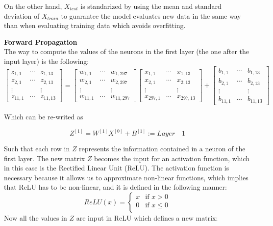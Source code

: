 \documentclass[12pt]{article}
\begin{document}
On the other hand, $X_{test}$ is standarized by using the mean and standard deviation of $X_{train}$ to guarantee the model evaluates new data in the same way than when evaluating training data which avoids overfitting.



\textbf{Forward Propagation}\\
The way to compute the values of the neurons in the first layer (the one after the input layer) is the following:
\[
\begin{bmatrix}
   z_{1,1} & \cdots & z_{1,13} \\
   z_{2,1} & \cdots & z_{2,13} \\
   \vdots &   & \vdots \\
   z_{11,1} & \cdots & z_{11,13}
\end{bmatrix}
=
\begin{bmatrix}
    w_{1,1} & \cdots & w_{1,297} \\
    w_{2,1} & \cdots & w_{2,297} \\
    \vdots &   & \vdots \\
    w_{11,1} & \cdots & w_{11,297}
\end{bmatrix}
\begin{bmatrix}
    x_{1,1} & \cdots & x_{1,13} \\
    x_{2,1} & \cdots & x_{2,13} \\
    \vdots &   & \vdots \\
    x_{297,1} & \cdots & x_{297,13}
\end{bmatrix}
+
\begin{bmatrix}
    b_{1,1} & \cdots & b_{1,13} \\
    b_{2,1} & \cdots & b_{2,13} \\
    \vdots &   & \vdots \\
    b_{11,1} & \cdots & b_{11,13}
\end{bmatrix}
\]

Which can be re-writed as 

\begin{equation}
    Z^{[1]} = W^{[1]}X^{[0]} + B^{[1]} := Layer \quad 1
\end{equation}

Such that each row in $Z$ represents the information contained in a neuron of the first layer.
The new matrix $Z$ becomes the input for an activation function, which in this case is the Rectified Linear Unit (ReLU). The activation function is necessary because it allows us to approximate non-linear functions, which implies that ReLU has to be non-linear,
and it is defined in the following manner:
\[
ReLU(x) = 
\begin{cases} 
   x & \text{if } x > 0 \\
    0 & \text{if } x \leq 0 \\
\end{cases}
\]
Now all the values in $Z$ are input in ReLU which defines a new matrix:
\end{document}
